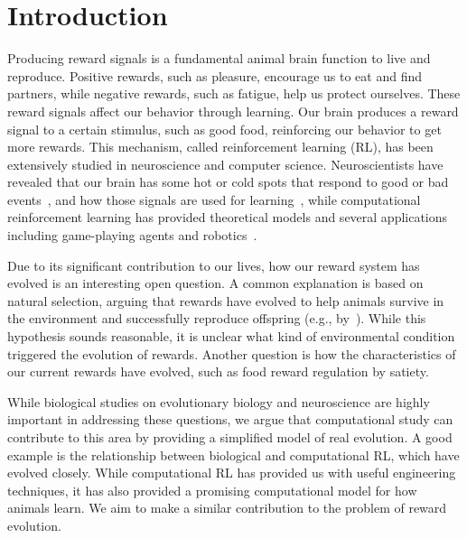 \section{Introduction}\label{sec:intro}
Producing reward signals is a fundamental animal brain function to live and reproduce. Positive rewards, such as pleasure, encourage us to eat and find partners, while negative rewards, such as fatigue, help us protect ourselves. These reward signals affect our behavior through learning. Our brain produces a reward signal to a certain stimulus, such as good food, reinforcing our behavior to get more rewards. This mechanism, called reinforcement learning (RL), has been extensively studied in neuroscience and computer science. Neuroscientists have revealed that our brain has some hot or cold spots that respond to good or bad events~\citep{berridgeAffectiveNeurosciencePleasure2008}, and how those signals are used for learning~\citep{schultzNeuronalRewardDecision2015}, while computational reinforcement learning has provided theoretical models and several applications including game-playing agents and robotics~\citep{suttonReinforcementLearningIntroduction2018}.

Due to its significant contribution to our lives, how our reward system has evolved is an interesting open question. A common explanation is based on natural selection, arguing that rewards have evolved to help animals survive in the environment and successfully reproduce offspring (e.g., by~\cite{schultzNeuronalRewardDecision2015}). While this hypothesis sounds reasonable, it is unclear what kind of environmental condition triggered the evolution of rewards. Another question is how the characteristics of our current rewards have evolved, such as food reward regulation by satiety.

While biological studies on evolutionary biology and neuroscience are highly important in addressing these questions, we argue that computational study can contribute to this area by providing a simplified model of real evolution. A good example is the relationship between biological and computational RL, which have evolved closely. While computational RL has provided us with useful engineering techniques, it has also provided a promising computational model for how animals learn. We aim to make a similar contribution to the problem of reward evolution.

